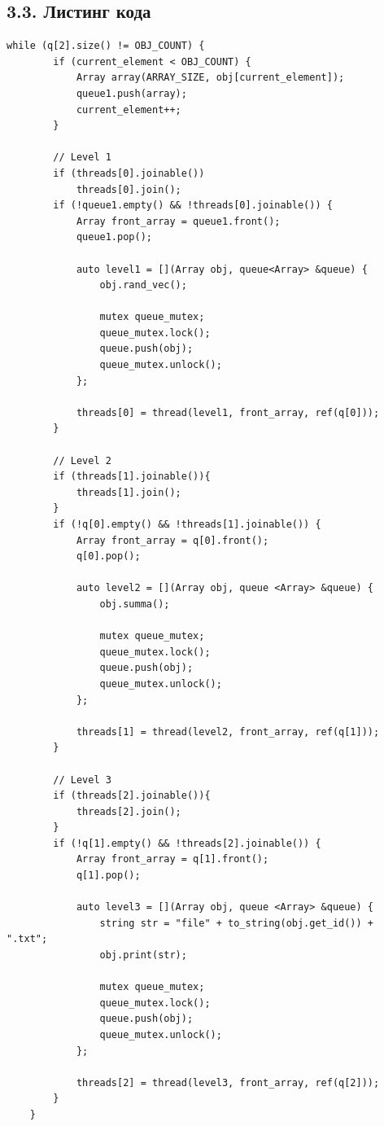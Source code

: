 \documentclass[a4paper,12pt]{article}
\begin{document}
\subsection*{3.3. Листинг кода}




\begin{lstlisting}[label=some-code,caption=Конвейер]
while (q[2].size() != OBJ_COUNT) {
        if (current_element < OBJ_COUNT) {
            Array array(ARRAY_SIZE, obj[current_element]);
            queue1.push(array);
            current_element++;
        }

        // Level 1
        if (threads[0].joinable())
            threads[0].join();
        if (!queue1.empty() && !threads[0].joinable()) {
            Array front_array = queue1.front();
            queue1.pop();

            auto level1 = [](Array obj, queue<Array> &queue) {
                obj.rand_vec();

                mutex queue_mutex;
                queue_mutex.lock();
                queue.push(obj);
                queue_mutex.unlock();
            };

            threads[0] = thread(level1, front_array, ref(q[0]));
        }

        // Level 2
        if (threads[1].joinable()){
            threads[1].join();
        }
        if (!q[0].empty() && !threads[1].joinable()) {
            Array front_array = q[0].front();
            q[0].pop();

            auto level2 = [](Array obj, queue <Array> &queue) {
                obj.summa();

                mutex queue_mutex;
                queue_mutex.lock();
                queue.push(obj);
                queue_mutex.unlock();
            };

            threads[1] = thread(level2, front_array, ref(q[1]));
        }

        // Level 3
        if (threads[2].joinable()){
            threads[2].join();
        }
        if (!q[1].empty() && !threads[2].joinable()) {
            Array front_array = q[1].front();
            q[1].pop();

            auto level3 = [](Array obj, queue <Array> &queue) {
                string str = "file" + to_string(obj.get_id()) + ".txt";
                obj.print(str);

                mutex queue_mutex;
                queue_mutex.lock();
                queue.push(obj);
                queue_mutex.unlock();
            };

            threads[2] = thread(level3, front_array, ref(q[2]));
        }
    }
\end{lstlisting}
\end{document}
